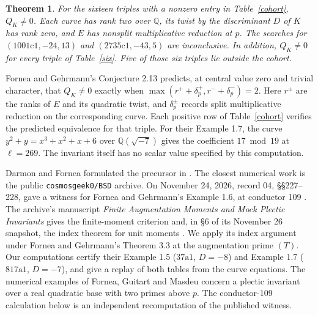 \documentclass[11pt]{article}
\newtheorem{theorem}{Theorem}
\newcommand{\Q}{\mathbb Q}
\begin{document}
\begin{theorem}\label{main}
For the sixteen triples with a nonzero entry in Table~\ref{cohort}, $Q_K\ne0$. Each curve has rank two over $\Q$, its twist by the discriminant $D$ of $K$ has rank zero, and $E$ has nonsplit multiplicative reduction at $p$. The searches for $(1001\mathrm c1,-24,13)$ and $(2735\mathrm c1,-43,5)$ are inconclusive. In addition, $Q_K\ne0$ for every triple of Table~\ref{six}. Five of those six triples lie outside the cohort.
\end{theorem}

Fornea and Gehrmann's Conjecture 2.13 predicts, at central value zero and trivial character, that $Q_K\ne0$ exactly when $\max(r^++\delta_p^+,r^-+\delta_p^-)=2$. Here $r^\pm$ are the ranks of $E$ and its quadratic twist, and $\delta_p^\pm$ records split multiplicative reduction on the corresponding curve. Each positive row of Table~\ref{cohort} verifies the predicted equivalence for that triple. For their Example 1.7, the curve $y^2+y=x^3+x^2+x+6$ over $\Q(\sqrt{-7})$ gives the coefficient $17\bmod19$ at $\ell=269$. The invariant itself has no scalar value specified by this computation.

Darmon and Fornea formulated the precursor in \cite[Conjecture 3.12]{DF}. The closest numerical work is the public \texttt{cosmosgeek0/BSD} archive. On November 24, 2026, record 04, \S\S227--228, gave a witness for Fornea and Gehrmann's Example 1.6, at conductor 109 \cite{record}. The archive's manuscript \emph{Finite Augmentation Moments and Mock Plectic Invariants} gives the finite-moment criterion and, in \S6 of its November 26 snapshot, the index theorem for unit moments \cite{criterion,current}. We apply its index argument under Fornea and Gehrmann's Theorem 3.3 at the augmentation prime $(T)$. Our computations certify their Example 1.5 ($37\mathrm a1$, $D=-8$) and Example 1.7 ($817\mathrm a1$, $D=-7$), and give a replay of both tables from the curve equations. The numerical examples of Fornea, Guitart and Masdeu \cite[\S7]{FGM} concern a plectic invariant over a real quadratic base with two primes above $p$. The conductor-109 calculation below is an independent recomputation of the published witness.
\end{document}

